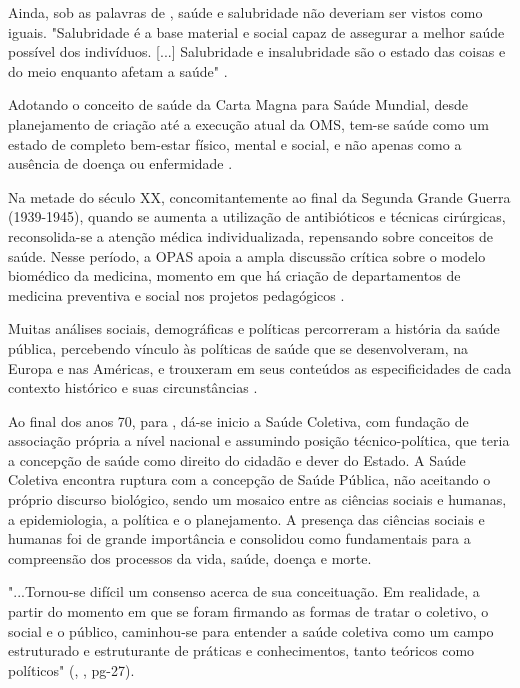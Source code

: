 \indent Ainda, sob as palavras de , saúde e salubridade não deveriam ser vistos como iguais. "Salubridade é a base material e social capaz de assegurar a melhor saúde possível dos indivíduos. [...] Salubridade e insalubridade são o estado das coisas e do meio enquanto afetam a saúde"  \cite{Foucault1990Microfisica}.

\indent Adotando o conceito de saúde da Carta Magna para Saúde Mundial, desde planejamento de criação até a execução atual da \acrfull{OMS}, tem-se saúde como um estado de completo bem-estar físico, mental e social, e não apenas como a ausência de doença ou enfermidade \cite{OMS2024S1, ParranHEALTH}.

\indent  Na metade do século XX, concomitantemente ao final da Segunda Grande Guerra (1939-1945), quando se aumenta a utilização de antibióticos e técnicas cirúrgicas, reconsolida-se a atenção médica individualizada, repensando sobre conceitos de saúde. Nesse período, a \acrfull{OPAS} apoia a ampla discussão crítica sobre o modelo biomédico da medicina, momento em que há criação de departamentos de medicina preventiva e social nos projetos pedagógicos \cite{TratadoSaudeColetiva}.

\indent Muitas análises sociais, demográficas e políticas percorreram a história da saúde pública, percebendo vínculo às políticas de saúde que se desenvolveram, na Europa e nas Américas, e trouxeram em seus conteúdos as especificidades de cada contexto histórico e suas circunstâncias \cite{TratadoSaudeColetiva}.

\indent Ao final dos anos 70, para , dá-se inicio a Saúde Coletiva, com fundação de associação própria a nível nacional e assumindo posição técnico-política, que teria a concepção de saúde como direito do cidadão e dever do Estado. A Saúde Coletiva encontra ruptura com a concepção de Saúde Pública, não aceitando o próprio discurso biológico, sendo um mosaico entre as ciências sociais e humanas, a epidemiologia, a política e o planejamento. A presença das ciências sociais e humanas foi de grande importância e consolidou como fundamentais para a compreensão dos processos da vida, saúde, doença e morte.

\begin{citacao}
\indent "...Tornou-se difícil um consenso acerca de sua conceituação. Em realidade, a partir do momento em que se foram firmando as formas de tratar o coletivo, o social e o público, caminhou-se para entender a saúde coletiva como um campo estruturado e estruturante de práticas e conhecimentos, tanto teóricos como políticos" (\citeauthor{TratadoSaudeColetiva}, \citeyear{TratadoSaudeColetiva}, pg-27).
\end{citacao}


